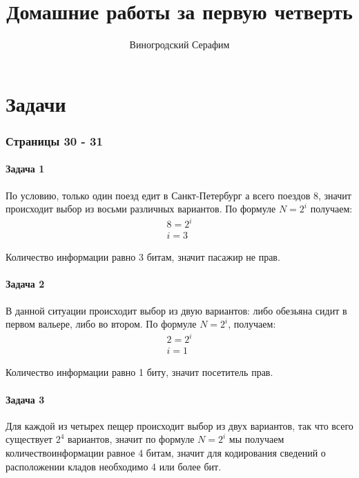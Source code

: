 \documentclass[12pt, a4paper]{article}
\title{Домашние работы за первую четверть}
\author{Виногродский Серафим}
\begin{document}
  \maketitle
  \setcounter{tocdepth}{2}
  \tableofcontents
  \pagebreak

  \part{Задачи}

  \section{Страницы 30 - 31}
  \subsection{Задача 1}
  По условию, только один поезд едит в Санкт-Петербург а всего поездов 8, значит 
  происходит выбор из восьми различных вариантов. По формуле $ N = 2^{i} $
  получаем:
  \begin{equation*}
    \begin{gathered}
      8 = 2^{i} \\
      i = 3
    \end{gathered}
  \end{equation*}

  Количество информации равно 3 битам, значит пасажир не прав.

  \subsection{Задача 2}
  В данной ситуации происходит выбор из двую вариантов: либо обезьяна сидит в
  первом вальере, либо во втором. По формуле $ N = 2^{i} $, получаем:
  \begin{equation*}
    \begin{gathered}
      2 = 2^{i} \\
      i = 1
    \end{gathered}
  \end{equation*}

  Количество информации равно 1 биту, значит посетитель прав.

  \subsection{Задача 3}
  Для каждой из четырех пещер происходит выбор из двух вариантов, так что всего 
  существует $ 2^{4} $ вариантов, значит по формуле $ N = 2^{i} $ мы получаем 
  количествоинформации равное 4 битам, значит для кодирования сведений о расположении
  кладов необходимо 4 или более бит.
\end{document}
